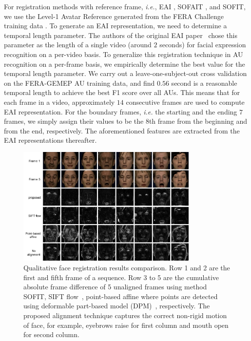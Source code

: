 \documentclass[10pt,journal]{IEEEtran}
\begin{document}
For registration methods with reference frame, \textit{i.e.}, EAI \cite{Yang_SMCB12}, SOFAIT \cite{Yang_FG13}, and SOFIT, we use the Level-1 Avatar Reference \cite{Yang_SMCB12} generated from the FERA Challenge training data \cite{FERA11}. To generate an EAI representation, we need to determine a temporal length parameter. The authors of the original EAI paper~\cite{Yang_SMCB12} chose this parameter as the length of a single video (around $2$ seconds) for facial expression recognition on a per-video basis. To generalize this registration technique in AU recognition on a per-frame basis, we empirically determine the best value for the temporal length parameter. We carry out a leave-one-subject-out cross validation on the FERA-GEMEP AU training data, and find $0.56$ second is a reasonable temporal length to achieve the best F1 score over all AUs. This means that for each frame in a video, approximately $14$ consecutive frames are used to compute EAI representation. For the boundary frames, \textit{i.e.} the starting and the ending $7$ frames, we simply assign their values to be the $8$th frame from the beginning and from the end, respectively. The aforementioned features are extracted from the EAI representations thereafter.

\begin{figure}[t]
	\centering
		\includegraphics[width=0.8\textwidth]{fig/fera_diff.png}
	\caption{Qualitative face registration results comparison. Row 1 and 2 are the first and fifth frame of a sequence. Row 3 to 5 are the cumulative absolute frame difference of 5 unaligned frames using method SOFIT, SIFT flow~\cite{Liu_PAMI11}, point-based affine where points are detected using deformable part-based model (DPM)~\cite{Zhu_CVPR12}, respectively. The proposed alignment technique captures the correct non-rigid motion of face, for example, eyebrows raise for first column and mouth open for second column.}
	\label{fig:fera_diff}
\end{figure}
\end{document}
